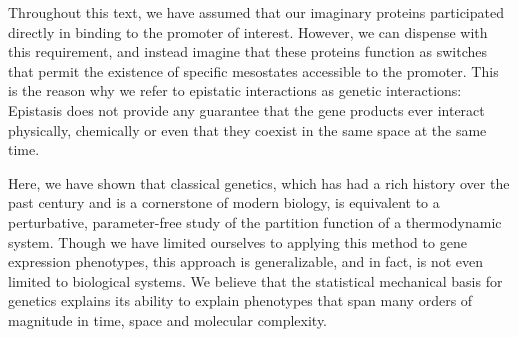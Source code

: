 Throughout this text, we have assumed that our imaginary proteins participated
directly in binding to the promoter of interest. However, we can dispense with
this requirement, and instead imagine that these proteins function as switches
that permit the existence of specific mesostates accessible to the promoter.
This is the reason why we refer to epistatic interactions as genetic
interactions: Epistasis does not provide any guarantee that the gene products
ever interact physically, chemically or even that they coexist in the same space
at the same time.

Here, we have shown that classical genetics, which has had a rich history over
the past century and is a cornerstone of modern biology, is equivalent to a
perturbative, parameter-free study of the partition function of a thermodynamic
system. Though we have limited ourselves to applying this method to gene
expression phenotypes, this approach is generalizable, and in fact, is not even
limited to biological systems. We believe that the statistical mechanical basis
for genetics explains its ability to explain phenotypes that span many orders of
magnitude in time, space and molecular complexity.

